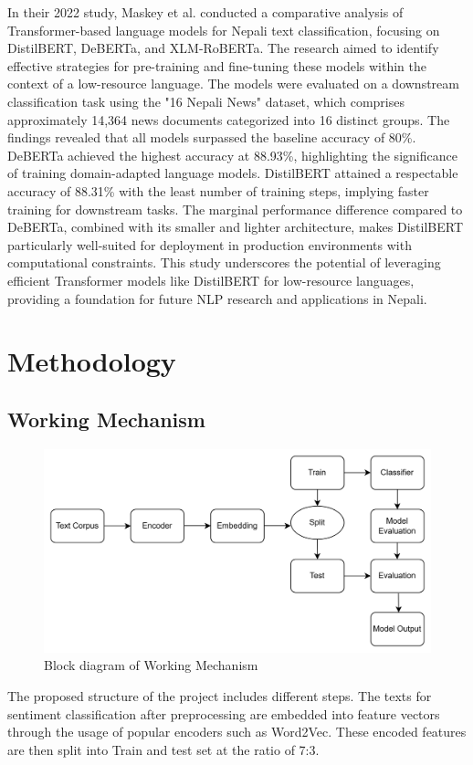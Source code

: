 In their 2022 study, Maskey et al. conducted a comparative analysis of Transformer-based language models for Nepali text classification, focusing on DistilBERT, DeBERTa, and XLM-RoBERTa. The research aimed to identify effective strategies for pre-training and fine-tuning these models within the context of a low-resource language. The models were evaluated on a downstream classification task using the "16 Nepali News" dataset, which comprises approximately 14,364 news documents categorized into 16 distinct groups.
The findings revealed that all models surpassed the baseline accuracy of 80\%. DeBERTa achieved the highest accuracy at 88.93\%, highlighting the significance of training domain-adapted language models. DistilBERT attained a respectable accuracy of 88.31\% with the least number of training steps, implying faster training for downstream tasks. The marginal performance difference compared to DeBERTa, combined with its smaller and lighter architecture, makes DistilBERT particularly well-suited for deployment in production environments with computational constraints. This study underscores the potential of leveraging efficient Transformer models like DistilBERT for low-resource languages, providing a foundation for future NLP research and applications in Nepali.

\chapter{Methodology}

\section{Working Mechanism}

\begin{figure}[h]
\centering
\includegraphics[scale=0.23]{images/methodology.png}
\caption{Block diagram of Working Mechanism}
\end{figure}
The proposed structure of the project includes different steps. The texts for sentiment classification after preprocessing are embedded into feature vectors through the usage of popular encoders such as Word2Vec. These encoded features are then split into Train and test set at the ratio of 7:3.

